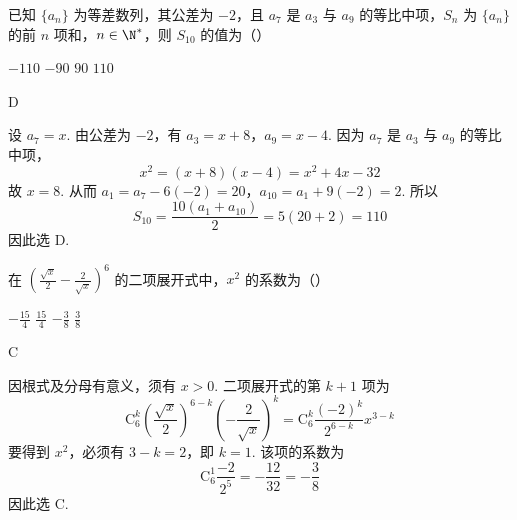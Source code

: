 \begin{problem}
已知 \( \{a_{n}\} \) 为等差数列，其公差为 \(-2\)，且 \( a_{7} \) 是 \( a_{3} \) 与 \( a_{9} \) 的等比中项，\( S_{n} \) 为 \( \{a_{n}\} \) 的前 \(n\) 项和，\( n \in \N^{*} \)，则 \(S_{10}\) 的值为（\quad）

\choices
    {\(-110\)}
    {\(-90\)}
    {\(90\)}
    {\(110\)}
\begin{answer}
D
\end{answer}

\begin{solution}
设 \(a_7=x\). 由公差为 \(-2\)，有
\(a_3=x+8\)，\(a_9=x-4\).
因为 \(a_7\) 是 \(a_3\) 与 \(a_9\) 的等比中项，
\[
x^2=(x+8)(x-4)=x^2+4x-32
\]
故 \(x=8\). 从而
\(a_1=a_7-6(-2)=20\)，\(a_{10}=a_1+9(-2)=2\).
所以
\[
S_{10}=\frac{10(a_1+a_{10})}{2}
=5(20+2)=110
\]
因此选 D.
\end{solution}
\end{problem}

\begin{problem}
在 \(\left(\frac{\sqrt{x}}{2} - \frac{2}{\sqrt{x}}\right)^{6}\) 的二项展开式中，\(x^{2}\) 的系数为（\quad）

\choices
    {\(-\frac{15}{4}\)}
    {\( \frac{15}{4} \)}
    {\(-\frac{3}{8}\)}
    {\(\frac{3}{8}\)}
\begin{answer}
C
\end{answer}

\begin{solution}
因根式及分母有意义，须有 \(x>0\). 二项展开式的第 \(k+1\) 项为
\[
\mathrm C_6^k
\left(\frac{\sqrt{x}}{2}\right)^{6-k}
\left(-\frac{2}{\sqrt{x}}\right)^k
=\mathrm C_6^k\frac{(-2)^k}{2^{6-k}}x^{3-k}
\]
要得到 \(x^2\)，必须有 \(3-k=2\)，即 \(k=1\). 该项的系数为
\[
\mathrm C_6^1\frac{-2}{2^5}
=-\frac{12}{32}
=-\frac{3}{8}
\]
因此选 C.
\end{solution}
\end{problem}

